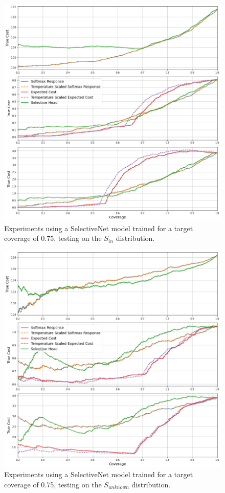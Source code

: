 \begin{figure}[H]
	\includegraphics[width=\textwidth]{images/binary/sn0.75_in_distribution.png}
	\caption*{Experiments using a SelectiveNet model trained for a target coverage of 0.75, testing on the $S_{in}$ distribution.}
\end{figure}

\begin{figure}[H]
	\includegraphics[width=\textwidth]{images/binary/sn0.75_out_distribution.png}
	\caption*{Experiments using a SelectiveNet model trained for a target coverage of 0.75, testing on the $S_{unknown}$ distribution.}
\end{figure}

